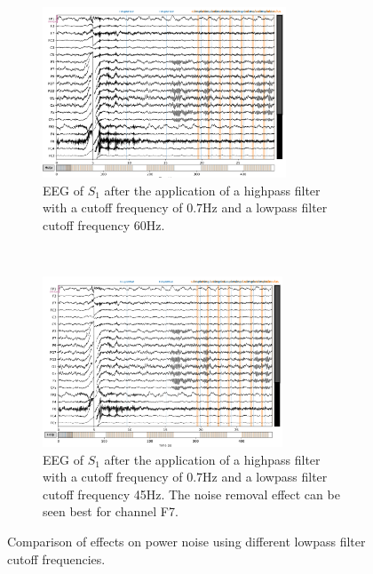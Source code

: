 \documentclass[a4paper]{article}
\begin{document}
\begin{figure}[tbh!] 
\centering
 \begin{subfigure}[t]{0.5\textwidth}
        \centering
        \includegraphics[height=2.0in]{lp60.png}
\caption{EEG of $S_1$ after the application of a highpass filter with a cutoff frequency of 0.7Hz and a lowpass filter cutoff frequency 60Hz.}
\end{subfigure}%
    ~ 
\begin{subfigure}[t]{0.5\textwidth}
        \centering
        \includegraphics[height=2.0in]{lp45.png}
        \caption{EEG of $S_1$ after the application of a highpass filter with a cutoff frequency of 0.7Hz and a lowpass filter cutoff frequency 45Hz. The noise removal effect can be seen best for channel F7.}
\end{subfigure}
    \caption{Comparison of effects on power noise using different lowpass filter cutoff frequencies.}
    \label{fig:filteringLowpassComparison}
\end{figure}
\end{document}
